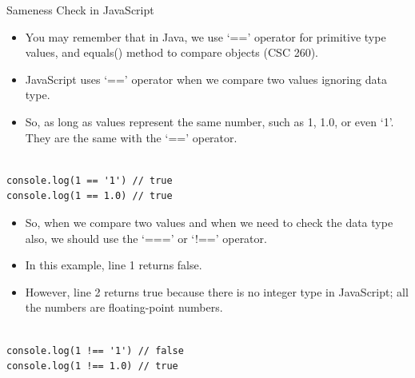 \begin{frame}[fragile]{Sameness Check in JavaScript}

\begin{itemize}
	\item You may remember that in Java, we use `==' operator for primitive type values, and equals() method to compare objects (CSC 260). 
	\item JavaScript uses `==' operator when we compare two values ignoring data type. 
	\item So, as long as values represent the same number, such as 1, 1.0, or even `1'. They are the same with the `==' operator. 
\end{itemize}

\begin{Code}{}%
\begin{lstlisting}[firstnumber=1, label=glabels, xleftmargin=0pt, basicstyle=\scriptsize]% 

console.log(1 == '1') // true
console.log(1 == 1.0) // true
\end{lstlisting}%
\end{Code}%
\end{frame}

\begin{frame}[fragile]{}

\begin{itemize}
	\item So, when we compare two values and when we need to check the data type also, we should use the `===' or `!==' operator. 
	\item In this example, line 1 returns false.
	\item However, line 2 returns true because there is no integer type in JavaScript; all the numbers are floating-point numbers. 
\end{itemize}

\begin{Code}{}%
\begin{lstlisting}[firstnumber=1, label=glabels, xleftmargin=0pt, basicstyle=\scriptsize]% 

console.log(1 !== '1') // false
console.log(1 !== 1.0) // true
\end{lstlisting}%
\end{Code}%
\end{frame}

